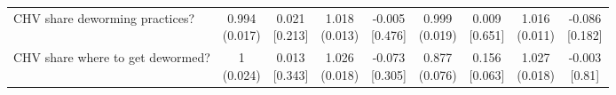 {\begin{tabular}[t]{lcccccccc}
\hspace{1em}CHV share deworming practices? & \makecell[c]{0.994\\(0.017)} & \makecell[c]{0.021\\{[0.213]}} & \makecell[c]{1.018\\(0.013)} & \makecell[c]{-0.005\\{[0.476]}} & \makecell[c]{0.999\\(0.019)} & \makecell[c]{0.009\\{[0.651]}} & \makecell[c]{1.016\\(0.011)} & \makecell[c]{-0.086\\{[0.182]}}\\
\hspace{1em}CHV share where to get dewormed? & \makecell[c]{1\\(0.024)} & \makecell[c]{0.013\\{[0.343]}} & \makecell[c]{1.026\\(0.018)} & \makecell[c]{-0.073\\{[0.305]}} & \makecell[c]{0.877\\(0.076)} & \makecell[c]{0.156\\{[0.063]}} & \makecell[c]{1.027\\(0.018)} & \makecell[c]{-0.003\\{[0.81]}}\\
\bottomrule
\end{tabular}}

